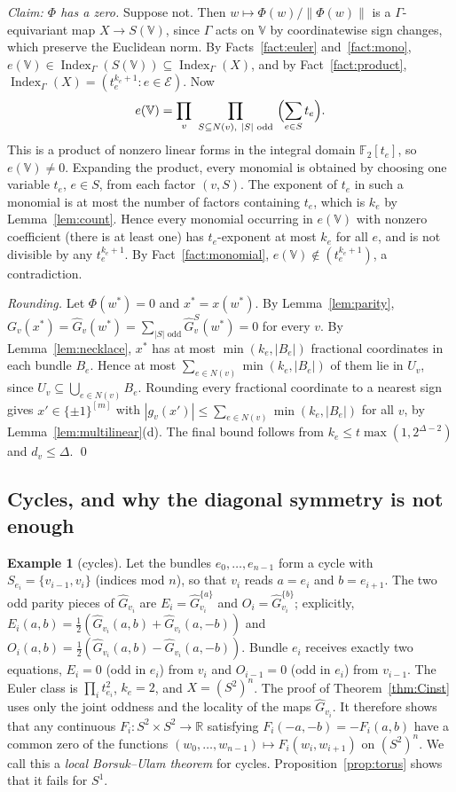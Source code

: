 \documentclass[11pt,letterpaper]{article}
\theoremstyle{definition}
\newtheorem{example}[theorem]{Example}
\newcommand{\R}{\mathbb{R}}
\newcommand{\FF}{\mathbb{F}}
\newcommand{\cE}{\mathcal{E}}
\newcommand{\cube}[1]{\{\pm1\}^{#1}}
\DeclareMathOperator{\Index}{Index}
\newcommand{\hG}{\widehat{G}}
\begin{document}
\emph{Claim: $\Phi$ has a zero.} Suppose not. Then $w\mapsto\Phi(w)/\|\Phi(w)\|$ is a
$\Gamma$-equivariant map $X\to S(\mathbb V)$, since $\Gamma$ acts on $\mathbb V$ by coordinatewise sign changes,
which preserve the Euclidean norm. By Facts~\ref{fact:euler} and~\ref{fact:mono}, $e(\mathbb V)\in\Index_\Gamma(S(\mathbb V))\subseteq\Index_\Gamma(X)$, and by
Fact~\ref{fact:product}, $\Index_\Gamma(X)=(t_e^{k_e+1}:e\in\cE)$. Now
\[
  e(\mathbb V)=\prod_{v}\ \prod_{S\subseteq N(v),\ |S|\text{ odd}}\ \Bigl(\sum_{e\in S}t_e\Bigr).
\]
This is a product of nonzero linear forms in the integral domain $\FF_2[t_e]$, so $e(\mathbb V)\ne0$.
Expanding the product, every monomial is obtained by choosing one variable $t_e$, $e\in S$, from
each factor $(v,S)$. The exponent of $t_e$ in such a monomial is at most the number of factors
containing $t_e$, which is $k_e$ by Lemma~\ref{lem:count}. Hence every monomial occurring in
$e(\mathbb V)$ with nonzero coefficient (there is at least one) has $t_e$-exponent at most $k_e$ for all
$e$, and is not divisible by any $t_e^{k_e+1}$. By Fact~\ref{fact:monomial}, $e(\mathbb V)\notin(t_e^{k_e+1})$,
a contradiction.

\emph{Rounding.} Let $\Phi(w^*)=0$ and $x^*=x(w^*)$. By Lemma~\ref{lem:parity},
$G_v(x^*)=\hG_v(w^*)=\sum_{|S|\text{ odd}}\hG_v^S(w^*)=0$ for every $v$. By
Lemma~\ref{lem:necklace}, $x^*$ has at most $\min(k_e,|B_e|)$ fractional coordinates in each
bundle $B_e$. Hence at most $\sum_{e\in N(v)}\min(k_e,|B_e|)$ of them lie in $U_v$, since
$U_v\subseteq\bigcup_{e\in N(v)}B_e$. Rounding every fractional coordinate to a nearest sign gives
$x'\in\cube{[m]}$ with $|g_v(x')|\le\sum_{e\in N(v)}\min(k_e,|B_e|)$ for all $v$, by
Lemma~\ref{lem:multilinear}(d). The final bound follows from $k_e\le t\max(1,2^{\Delta-2})$ and
$d_v\le\Delta$. \qed

\subsection{Cycles, and why the diagonal symmetry is not enough}\label{sec:cycles}

\begin{example}[cycles]\label{ex:cycle}
Let the bundles $e_0,\dots,e_{n-1}$ form a cycle with $S_{e_i}=\{v_{i-1},v_i\}$ (indices mod $n$),
so that $v_i$ reads $a=e_i$ and $b=e_{i+1}$. The two odd parity pieces of $\hG_{v_i}$ are
$E_i=\hG^{\{a\}}_{v_i}$ and $O_i=\hG^{\{b\}}_{v_i}$; explicitly,
$E_i(a,b)=\frac12(\hG_{v_i}(a,b)+\hG_{v_i}(a,-b))$ and
$O_i(a,b)=\frac12(\hG_{v_i}(a,b)-\hG_{v_i}(a,-b))$. Bundle $e_i$ receives exactly two equations,
$E_i=0$ (odd in $e_i$) from $v_i$ and $O_{i-1}=0$ (odd in $e_i$) from $v_{i-1}$. The Euler class
is $\prod_it_{e_i}^2$, $k_e=2$, and $X=(S^2)^n$. The proof of Theorem~\ref{thm:Cinst} uses only
the joint oddness and the locality of the maps $\hG_{v_i}$. It therefore shows that any continuous
$F_i\colon S^2\times S^2\to\R$ satisfying $F_i(-a,-b)=-F_i(a,b)$ have a common zero of the
functions $(w_0,\dots,w_{n-1})\mapsto F_i(w_i,w_{i+1})$ on $(S^2)^n$. We call this a \emph{local
Borsuk--Ulam theorem} for cycles. Proposition~\ref{prop:torus} shows that it fails
for $S^1$.
\end{example}
\end{document}
